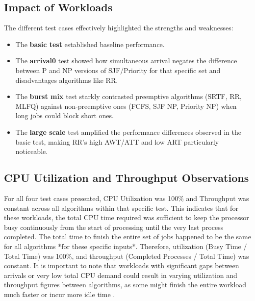 \documentclass[12pt]{article}
\begin{document}
\subsection{Impact of Workloads}
The different test cases effectively highlighted the strengths and weaknesses:
\begin{itemize}
    \item The \textbf{basic test} established baseline performance.
    \item The \textbf{arrival0} test showed how simultaneous arrival negates the difference between P and NP versions of SJF/Priority for that specific set and disadvantages algorithms like RR.
    \item The \textbf{burst mix} test starkly contrasted preemptive algorithms (SRTF, RR, MLFQ) against non-preemptive ones (FCFS, SJF NP, Priority NP) when long jobs could block short ones.
    \item The \textbf{large scale} test amplified the performance differences observed in the basic test, making RR's high AWT/ATT and low ART particularly noticeable.
\end{itemize}

\subsection{CPU Utilization and Throughput Observations}
For all four test cases presented, CPU Utilization was 100\% and Throughput was constant across all algorithms within that specific test. This indicates that for these workloads, the total CPU time required was sufficient to keep the processor busy continuously from the start of processing until the very last process completed. The total time to finish the entire set of jobs happened to be the same for all algorithms *for these specific inputs*. Therefore, utilization (Busy Time / Total Time) was 100\%, and throughput (Completed Processes / Total Time) was constant. It is important to note that workloads with significant gaps between arrivals or very low total CPU demand could result in varying utilization and throughput figures between algorithms, as some might finish the entire workload much faster or incur more idle time \citep{silberschatz2018operating}.
\end{document}
